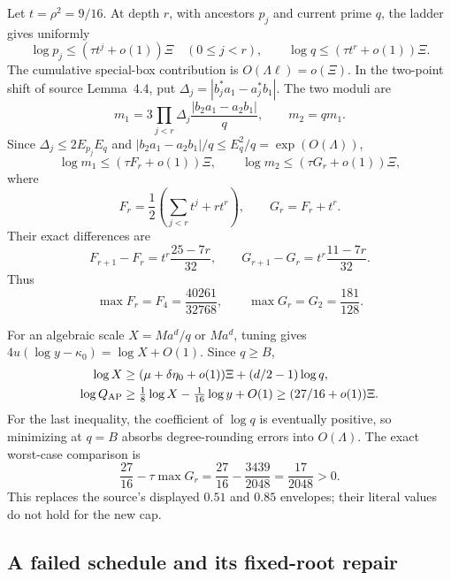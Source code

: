 Let $t=\rho^2=9/16$.  At depth $r$, with ancestors $p_j$ and
current prime $q$, the ladder gives uniformly
\[
 \log p_j\le(\tau t^j+o(1))\Xi\quad(0\le j<r),\qquad
 \log q\le(\tau t^r+o(1))\Xi.
\]
The cumulative special-box contribution is
$O(\Lambda\ell)=o(\Xi)$.  In the two-point shift of source
Lemma~4.4, put
$\Delta_j=|b_j^*a_1-a_j^*b_1|$.  The two moduli are
\begin{equation}
 m_1=3\prod_{j<r}\Delta_j
                 \frac{|b_2a_1-a_2b_1|}{q},\qquad m_2=qm_1.
 \label{rf:pathmoduli}
\end{equation}
Since $\Delta_j\le2E_{p_j}E_q$ and
$|b_2a_1-a_2b_1|/q\le E_q^2/q=\exp(O(\Lambda))$,
\[
 \log m_1\le(\tau F_r+o(1))\Xi,\qquad
 \log m_2\le(\tau G_r+o(1))\Xi,
\]
where
\[
 F_r=\frac12\left(\sum_{j<r}t^j+rt^r\right),\qquad
 G_r=F_r+t^r.
\]
Their exact differences are
\begin{equation}
 F_{r+1}-F_r=t^r\frac{25-7r}{32},\qquad
 G_{r+1}-G_r=t^r\frac{11-7r}{32}.
 \label{rf:fdiff}
\end{equation}
Thus
\begin{equation}
 \max F_r=F_4=\frac{40261}{32768},\qquad
 \max G_r=G_2=\frac{181}{128}.
 \label{rf:fmax}
\end{equation}

For an algebraic scale $X=Ma^d/q$ or $Ma^d$, tuning gives
$4u(\log y-\kappa_0)=\log X+O(1)$.  Since $q\ge B$,
\begin{align*}
 \log X&\ge(\mu+\delta\eta_0+o(1))\Xi+(d/2-1)\log q,\\
 \log Q_{\rm AP}&\ge\tfrac18\log X-\tfrac1{16}\log y+O(1)
             \ge(27/16+o(1))\Xi.
\end{align*}
For the last inequality, the coefficient of $\log q$ is eventually
positive, so minimizing at $q=B$ absorbs degree-rounding errors
into $O(\Lambda)$.  The exact worst-case comparison is
\begin{equation}
 \frac{27}{16}-\tau\max G_r
 =\frac{27}{16}-\frac{3439}{2048}
 =\frac{17}{2048}>0.
 \label{rf:algapgap}
\end{equation}
This replaces the source's displayed $0.51$ and $0.85$ envelopes;
their literal values do not hold for the new cap.

\subsection{A failed schedule and its fixed-root repair}
\label{rf:rootrepair}

